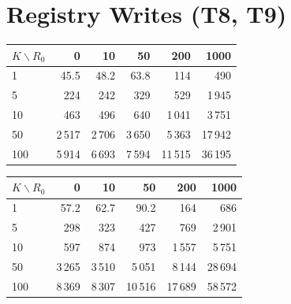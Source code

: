 \FloatBlock
\section{Registry Writes (T8, T9)}

\bigskip
\noindent\begin{minipage}{\textwidth}
  \centering
  \begin{minipage}[b]{0.48\textwidth}
    \centering
    {\captionsetup{textfont=sf}
    \label{tab:eval-t8}}
    \footnotesize
    \setlength{\tabcolsep}{3pt}
    \begin{tabular}{|l|r|r|r|r|r|}
      \hline
      $K\backslash R_0$ & 0 & 10 & 50 & 200 & 1000 \\
      \hline
      1   & 45.5     & 48.2     & 63.8     & 114       & 490       \\
      \hline
      5   & 224      & 242      & 329      & 529       & 1\,945    \\
      \hline
      10  & 463      & 496      & 640      & 1\,041    & 3\,751    \\
      \hline
      50  & 2\,517   & 2\,706   & 3\,650   & 5\,363    & 17\,942   \\
      \hline
      100 & 5\,914   & 6\,693   & 7\,594   & 11\,515   & 36\,195   \\
      \hline
    \end{tabular}
  \end{minipage}\hfill
  \begin{minipage}[b]{0.48\textwidth}
    \centering
    {\captionsetup{textfont=sf}
    \label{tab:eval-t9}}
    \footnotesize
    \setlength{\tabcolsep}{3pt}
    \begin{tabular}{|l|r|r|r|r|r|}
      \hline
      $K\backslash R_0$ & 0 & 10 & 50 & 200 & 1000 \\
      \hline
      1   & 57.2     & 62.7     & 90.2     & 164       & 686       \\
      \hline
      5   & 298      & 323      & 427      & 769       & 2\,901    \\
      \hline
      10  & 597      & 874      & 973      & 1\,557    & 5\,751    \\
      \hline
      50  & 3\,265   & 3\,510   & 5\,051   & 8\,144    & 28\,694   \\
      \hline
      100 & 8\,369   & 8\,307   & 10\,516  & 17\,689   & 58\,572   \\
      \hline
    \end{tabular}
  \end{minipage}
\end{minipage}

